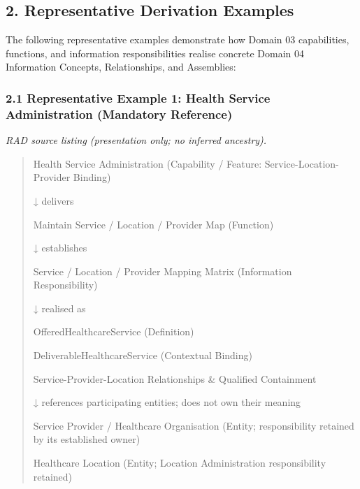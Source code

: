 \par\smallskip
{}\label{rad:traceability:41}
\subsection*{2. Representative Derivation Examples}
\label{rad:traceability:43}

The following representative examples demonstrate how Domain 03 capabilities, functions, and information responsibilities realise concrete Domain 04 Information Concepts, Relationships, and Assemblies:

\label{rad:traceability:45}
\subsubsection*{2.1 Representative Example 1: Health Service Administration (Mandatory Reference)}
\label{rad:traceability:47}

\textit{RAD source listing (presentation only; no inferred ancestry).}
\begin{quote}
Health Service Administration (Capability / Feature: Service-Location-Provider Binding)

↓ delivers

Maintain Service / Location / Provider Map (Function)

↓ establishes

Service / Location / Provider Mapping Matrix (Information Responsibility)

↓ realised as

OfferedHealthcareService (Definition)

DeliverableHealthcareService (Contextual Binding)

Service-Provider-Location Relationships \& Qualified Containment

↓ references participating entities; does not own their meaning

Service Provider / Healthcare Organisation (Entity; responsibility retained by its established owner)

Healthcare Location (Entity; Location Administration responsibility retained)
\end{quote}
\label{rad:traceability:62}


